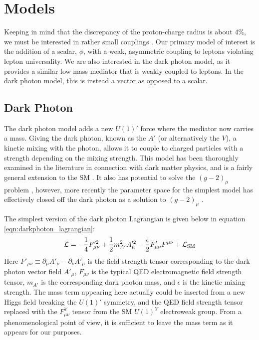 \section{Models}

Keeping in mind that the discrepancy of the proton-charge radius is about $4\%$, we must be interested in rather small couplings \cite{Carlson:2015jba}.
Our primary model of interest is the addition of a scalar, $\phi$, with a weak, asymmetric coupling to leptons violating lepton universality.
We are also interested in the dark photon model, as it provides a similar low mass mediator that is weakly coupled to leptons.
In the dark photon model, this is instead a vector as opposed to a scalar.

\subsection{Dark Photon}
The dark photon model adds a new $U(1)'$ force where the mediator now carries a mass.
Giving the dark photon, known as the $A'$ (or alternatively the $V$), a kinetic mixing with the photon, allows it to couple to charged particles with a strength depending on the mixing strength.
This model has been thoroughly examined in the literature in connection with dark matter physics, and is a fairly general extension to the SM \cite{Holdom:1985ag}.
It also has potential to solve the $(g-2)_\mu$ problem \cite{Pospelov:2008zw}, however, more recently the parameter space for the simplest model has effectively closed off the dark photon as a solution to $(g-2)_\mu$ \cite{Batley:2015lha}.

The simplest version of the dark photon Lagrangian is given below in equation \ref{eqn:darkphoton_lagrangian}:
\begin{equation}
\label{eqn:darkphoton_lagrangian}
\operatorname{\mathcal{L}} = -\frac{1}{4}F'^2_{\mu\nu} + \frac{1}{2}m_{A'}^2 A'^2_\mu - \frac{\epsilon}{2}F'_{\mu\nu} F^{\mu\nu} + \operatorname{\mathcal{L}}_{\textrm{SM}}
\end{equation}
Here $F'_{\mu\nu} \equiv \partial_\mu A'_\nu - \partial_\nu A'_\mu$ is the field strength tensor corresponding to the dark photon vector field $A'_\mu$, $F_{\mu\nu}$ is the typical QED electromagnetic field strength tensor, $m_{A'}$ is the corresponding dark photon mass, and $\epsilon$ is the kinetic mixing strength.
The mass term appearing here actually could be inserted from a new Higgs field breaking the $U(1)'$ symmetry, and the QED field strength tensor replaced with the $F^Y_{\mu\nu}$ tensor from the SM $U(1)^Y$ electroweak group.
From a phenomenological point of view, it is sufficient to leave the mass term as it appears for our purposes.

